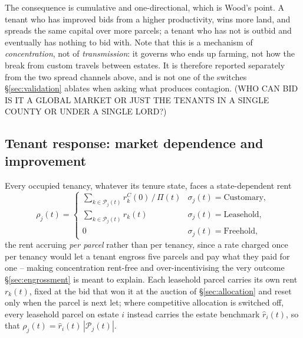 \documentclass[11pt,english]{article}
\begin{document}
The consequence is cumulative and one-directional, which is Wood's point. A tenant who has improved bids from a higher productivity, wins more land, and spreads the same capital over more parcels; a tenant who has not is outbid and eventually has nothing to bid with. Note that this is a mechanism of \emph{concentration}, not of \emph{transmission}: it governs who ends up farming, not how the break from custom travels between estates. It is therefore reported separately from the two spread channels above, and is not one of the switches \S\ref{sec:validation} ablates when asking what produces contagion. (WHO CAN BID IS IT A GLOBAL MARKET OR JUST THE TENANTS IN A SINGLE COUNTY OR UNDER A SINGLE LORD?)

\subsection{Tenant response: market dependence and improvement}
\label{sec:tenant}

Every occupied tenancy, whatever its tenure state, faces a state-dependent rent
\begin{equation}
\rho_j(t) = \begin{cases}
\sum_{k\in\mathcal{P}_j(t)} r_k^{C}(0)\,/\,\Pi(t) & \sigma_j(t)=\text{Customary},\\
\sum_{k\in\mathcal{P}_j(t)} r_k(t) & \sigma_j(t)=\text{Leasehold},\\
0 & \sigma_j(t)=\text{Freehold},
\end{cases}
\end{equation}
the rent accruing \emph{per parcel} rather than per tenancy, since a rate charged once per tenancy would let a tenant engross five parcels and pay what they paid for one -- making concentration rent-free and over-incentivising the very outcome \S\ref{sec:engrossment} is meant to explain. Each leasehold parcel carries its own rent $r_k(t)$, fixed at the bid that won it at the auction of \S\ref{sec:allocation} and reset only when the parcel is next let; where competitive allocation is switched off, every leasehold parcel on estate $i$ instead carries the estate benchmark $\hat r_i(t)$, so that $\rho_j(t)=\hat r_i(t)\,|\mathcal{P}_j(t)|$.
\end{document}

